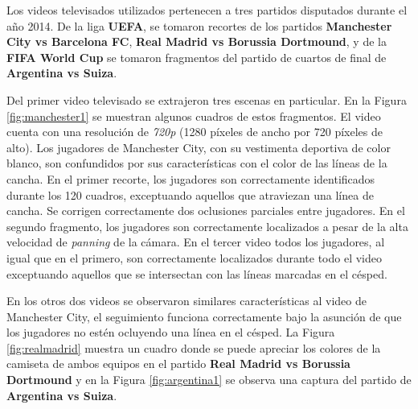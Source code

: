 Los videos televisados utilizados pertenecen a tres partidos disputados durante
el año 2014. De la liga \textbf{UEFA}, se tomaron recortes de los partidos
\textbf{Manchester City vs Barcelona FC}, \textbf{Real Madrid vs Borussia
Dortmound}, y de la \textbf{FIFA World Cup} se tomaron fragmentos del partido
de cuartos de final de \textbf{Argentina vs Suiza}.

Del primer video televisado se extrajeron tres escenas en particular. En la
Figura \ref{fig:manchester1} se muestran algunos cuadros de estos fragmentos.
El video cuenta con una resolución de \textit{720p} (1280 píxeles de ancho por
720 píxeles de alto). Los jugadores de Manchester City, con su vestimenta
deportiva de color blanco, son confundidos por sus características con el color
de las líneas de la cancha. En el primer recorte, los jugadores son
correctamente identificados durante los 120 cuadros, exceptuando aquellos que
atraviezan una línea de cancha. Se corrigen correctamente dos oclusiones
parciales entre jugadores. En el segundo fragmento, los jugadores son
correctamente localizados a pesar de la alta velocidad de \textit{panning} de
la cámara. En el tercer video todos los jugadores, al igual que en el primero,
son correctamente localizados durante todo el video exceptuando aquellos que se
intersectan con las líneas marcadas en el césped.

En los otros dos videos se observaron similares características al video de
Manchester City, el seguimiento funciona correctamente bajo la asunción de que
los jugadores no estén ocluyendo una línea en el césped. La Figura
\ref{fig:realmadrid} muestra un cuadro donde se puede apreciar los colores de
la camiseta de ambos equipos en el partido \textbf{Real Madrid vs Borussia
Dortmound} y en la Figura \ref{fig:argentina1} se observa una captura del
partido de \textbf{Argentina vs Suiza}.



